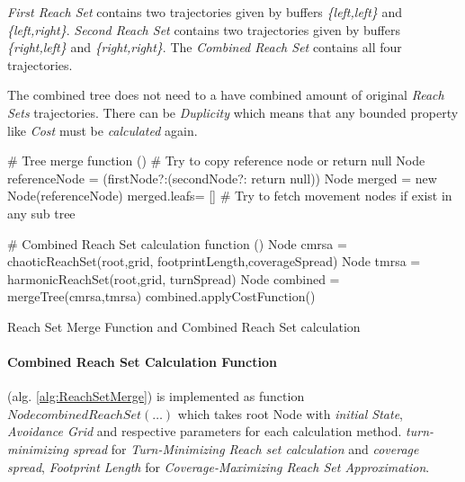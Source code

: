 \noindent\emph{First Reach Set} contains two trajectories given by buffers \emph{\{left,left\}} and \emph{\{left,right\}}. \emph{Second Reach Set} contains two trajectories given by buffers \emph{\{right,left\}} and \emph{\{right,right\}}. The \emph{Combined Reach Set} contains all four trajectories.

\begin{note}
    The combined tree \cite{o1996log} does not need to a have combined amount of original \emph{Reach Sets} trajectories. There can be \emph{Duplicity} which means that any bounded property like \emph{Cost} must be \emph{calculated} again.
\end{note}


\begin{algorithm}[H]
    
    \BlankLine
    \# Tree merge function\;
    \Fn(){}{
        \BlankLine
        \# Try to copy reference node or return null\;
        Node referenceNode = (firstNode?:(secondNode?: return null))\;
        Node merged =  new Node(referenceNode)\;
        merged.leafs= []\;
        \BlankLine
        \# Try to fetch movement nodes if exist in any sub tree\;
    }{}
    
    \BlankLine
    \# Combined Reach Set calculation function\;
    \Fn(){}{
        Node cmrsa = chaoticReachSet(root,grid, footprintLength,coverageSpread)\;
        Node tmrsa = harmonicReachSet(root,grid, turnSpread)\;
        Node combined = mergeTree(cmrsa,tmrsa)\;
        combined.applyCostFunction()\;
    }

    
    \caption{Reach Set Merge Function and Combined Reach Set calculation}
    \label{alg:ReachSetMerge}
\end{algorithm}

\paragraph{Combined Reach Set Calculation Function} (alg. \ref{alg:ReachSetMerge}) is implemented as function $Node combinedReachSet(\dots)$ which takes root Node with \emph{initial State}, \emph{Avoidance Grid} and respective parameters for each calculation method. \emph{turn-minimizing spread} for \emph{Turn-Minimizing Reach set calculation} and \emph{coverage spread}, \emph{Footprint Length} for \emph{Coverage-Maximizing Reach Set Approximation}.

